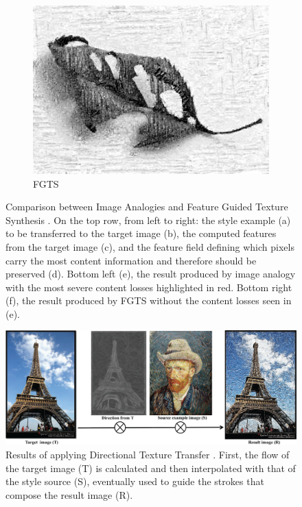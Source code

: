 \begin{figure}[p]
\begin{subfigure}[b]{0.5\textwidth}
    \includegraphics[width=\textwidth]{gfx/style-transfer-feature-6}
    \caption{FGTS}
  \end{subfigure}
  \caption{
    Comparison between Image Analogies and Feature Guided Texture Synthesis \cite{Xie2007}.
    On the top row, from left to right: the style example (a) to be transferred to the target image (b), the computed features from the target image (c), and the feature field defining which pixels carry the most content information and therefore should be preserved (d).
    Bottom left (e), the result produced by image analogy with the most severe content losses highlighted in red.
    Bottom right (f), the result produced by FGTS without the content losses seen in (e).
  }
  \label{fig:sec:context:style-transfer:style-transfer-feature}
\end{figure}

\begin{figure}[p]
  \includegraphics[width=\textwidth]{gfx/style-transfer-directional}
  \caption{
    Results of applying Directional Texture Transfer \cite{Lee2010}.
    First, the flow of the target image (T) is calculated and then interpolated with that of the style source (S), eventually used to guide the strokes that compose the result image (R).
  }
  \label{fig:sec:context:style-transfer:style-transfer-directional}
\end{figure}

